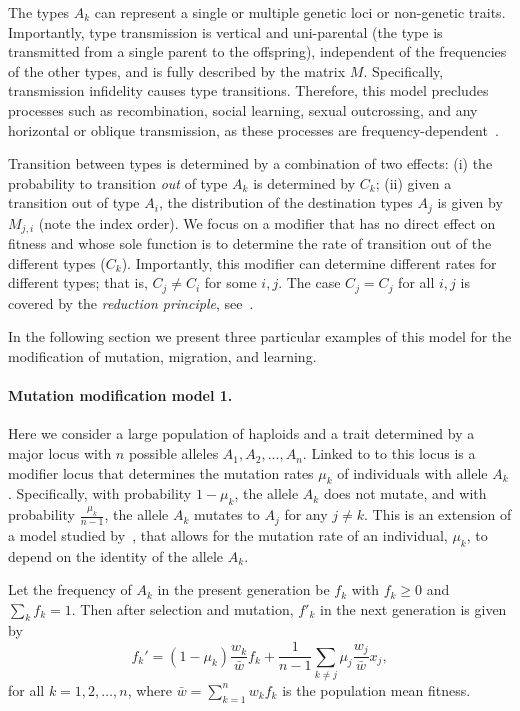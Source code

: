 \documentclass[9pt, a4paper, twocolumn]{extarticle}
\begin{document}
The types $A_k$ can represent a single or multiple genetic loci or non-genetic traits.
Importantly, type transmission is vertical and uni-parental (the type is transmitted from a single parent to the offspring), independent of the frequencies of the other types, and is fully described by the matrix $M$. Specifically, transmission infidelity causes type transitions.
Therefore, this model precludes processes such as recombination, social learning, sexual outcrossing, and any horizontal or oblique transmission, as these processes are frequency-dependent~\cite[pg.~54]{Cavalli-Sforza1981}.

Transition between types is determined by a combination of two effects:
(i) the probability to transition \emph{out} of type $A_k$ is determined by $C_k$;
(ii) given a transition out of type $A_i$, the distribution of the destination types $A_j$ is given by $M_{j,i}$ (note the index order).
We focus on a modifier that has no direct effect on fitness and whose sole function is to determine the rate of transition out of the different types ($C_k$).
Importantly, this modifier can determine different rates for different types; that is, $C_j \ne C_i$ for some $i,j$. The case $C_j = C_j$ for all $i,j$ is covered by the \emph{reduction principle}, see~\citet{Altenberg2017}.

In the following section we present three particular examples of this model for the modification of mutation, migration, and learning.

\paragraph*{Mutation modification model 1.}\label{sec:mut_model_1}

Here we consider a large population of haploids and a trait determined by a major locus with $n$ possible alleles $A_1, A_2, ..., A_n$.
Linked to to this locus is a modifier locus that determines the mutation rates $\mu_k$ of individuals with allele $A_k$.
Specifically, with probability $1-\mu_k$, the allele $A_k$ does not mutate, and with probability $\frac{\mu_k}{n-1}$, the allele $A_k$ mutates to $A_j$ for any $j \ne k$.
This is an extension of a model studied by~\citet{Altenberg2017}, that allows for the mutation rate of an individual, $\mu_k$, to depend on the identity of the allele $A_k$.

Let the frequency of $A_k$ in the present generation be $f_k$ with $f_k \ge 0$ and $\sum_k{f_k}=1$.
Then after selection and mutation, $f'_k$ in the next generation is given by
\begin{equation}
f_k' = (1 - \mu_k) \frac{w_k}{\bar{w}} f_k + \frac{1}{n-1} \sum_{k \ne j}{\mu_j \frac{w_j}{\bar{w}} x_j},
\label{eq:mutation_model_1}
\end{equation}
for all $k=1,2,\ldots,n$, where $\bar{w} = \sum_{k=1}^{n}{w_k f_k}$ is the population mean fitness.
\end{document}
